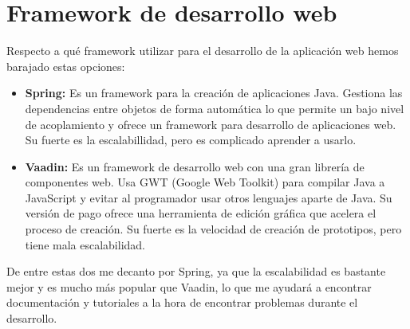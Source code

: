 \section{Framework de desarrollo web}
Respecto a qué framework utilizar para el desarrollo de la aplicación web hemos barajado estas opciones:
\begin{itemize}
	\item \textbf{Spring:}
	Es un framework para la creación de aplicaciones Java. Gestiona las dependencias entre objetos de forma automática lo que permite un bajo nivel de acoplamiento y ofrece un framework para desarrollo de aplicaciones web. Su fuerte es la escalabillidad, pero es complicado aprender a usarlo.
	\item \textbf{Vaadin:}
	Es un framework de desarrollo web con una gran librería de componentes web. Usa GWT (Google Web Toolkit) para compilar Java a JavaScript y evitar al programador usar otros lenguajes aparte de Java. Su versión de pago ofrece una herramienta de edición gráfica que acelera el proceso de creación. Su fuerte es la velocidad de creación de prototipos, pero tiene mala escalabilidad.
\end{itemize}

De entre estas dos me decanto por Spring, ya que la escalabilidad es bastante mejor y es mucho más popular que Vaadin, lo que me ayudará a encontrar documentación y tutoriales a la hora de encontrar problemas durante el desarrollo.